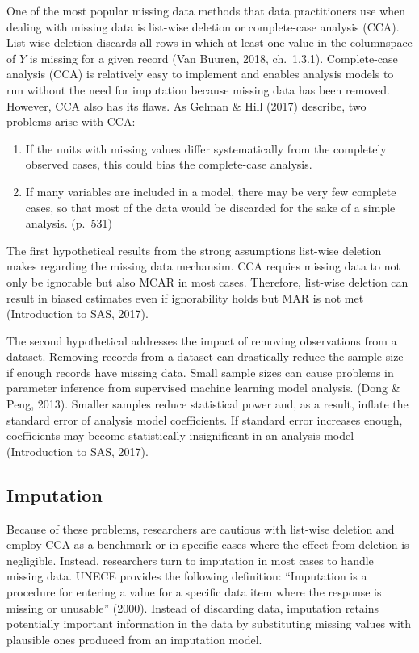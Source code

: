 \documentclass[12pt,oneside]{chicagocapstone}
\providecommand{\tightlist}{%
  \setlength{\itemsep}{0pt}\setlength{\parskip}{0pt}}
\begin{document}
One of the most popular missing data methods that data practitioners use
when dealing with missing data is list-wise deletion or complete-case
analysis (CCA). List-wise deletion discards all rows in which at least
one value in the columnspace of \(Y\) is missing for a given record (Van
Buuren, 2018, ch.~1.3.1). Complete-case analysis (CCA) is relatively
easy to implement and enables analysis models to run without the need
for imputation because missing data has been removed. However, CCA also
has its flaws. As Gelman \& Hill (2017) describe, two problems arise
with CCA:
\begin{enumerate}
\def\labelenumi{\arabic{enumi}.}
\tightlist
\item
  If the units with missing values differ systematically from the
  completely observed cases, this could bias the complete-case analysis.
\item
  If many variables are included in a model, there may be very few
  complete cases, so that most of the data would be discarded for the
  sake of a simple analysis. (p.~531)
\end{enumerate}
The first hypothetical results from the strong assumptions list-wise
deletion makes regarding the missing data mechansim. CCA requies missing
data to not only be ignorable but also MCAR in most cases. Therefore,
list-wise deletion can result in biased estimates even if ignorability
holds but MAR is not met (Introduction to SAS, 2017).

The second hypothetical addresses the impact of removing observations
from a dataset. Removing records from a dataset can drastically reduce
the sample size if enough records have missing data. Small sample sizes
can cause problems in parameter inference from supervised machine
learning model analysis. (Dong \& Peng, 2013). Smaller samples reduce
statistical power and, as a result, inflate the standard error of
analysis model coefficients. If standard error increases enough,
coefficients may become statistically insignificant in an analysis model
(Introduction to SAS, 2017).

\subsection*{Imputation}\label{background-imputation}

Because of these problems, researchers are cautious with list-wise
deletion and employ CCA as a benchmark or in specific cases where the
effect from deletion is negligible. Instead, researchers turn to
imputation in most cases to handle missing data. UNECE provides the
following definition: ``Imputation is a procedure for entering a value
for a specific data item where the response is missing or unusable''
(2000). Instead of discarding data, imputation retains potentially
important information in the data by substituting missing values with
plausible ones produced from an imputation model.
\end{document}
